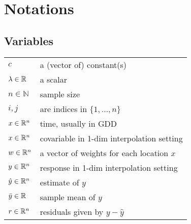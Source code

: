\chapter*{Notations}
\label{c:Notation}

\section*{Variables}

\renewcommand{\arraystretch}{1.3} %
\begin{tabular}{l l}
$c$		& a (vector of) constant(s)\\
$\lambda \in \mathbb{R}$		& a scalar\\
$n\in \mathbb{N}$		& sample size\\
$i,j$		& are indices in $\{1,\dots,n\}$\\
$x\in \mathbb{R}^n$		& time, usually in GDD\\
$x\in \mathbb{R}^n$		& covariable in 1-dim interpolation setting\\
$w \in \mathbb{R}^n$		& a vector of weights for each location $x$\\
$y\in \mathbb{R}^n$		& response in 1-dim interpolation setting\\
$\hat y\in \mathbb{R}^n$		& estimate of $y$\\
$\bar y\in \mathbb{R}$		& sample mean of $y$\\
$r \in \mathbb{R}^n$		& residuals given by $y - \hat y$
\end{tabular}

